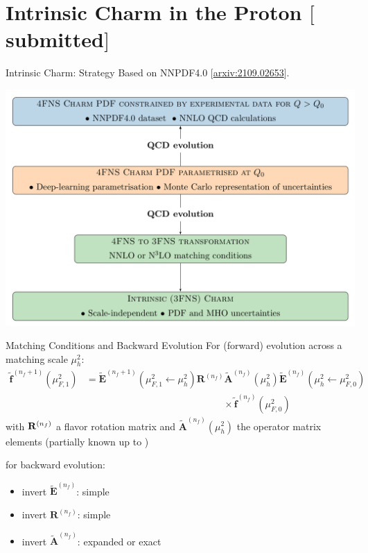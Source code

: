 \documentclass[9pt]{beamer}
\providecommand{\iRef}[1]{{\color{mLightGreen}\small $[$#1$]$}}
\begin{document}
\section{Intrinsic Charm in the Proton \iRef{submitted}}

\begin{frame}{Intrinsic Charm: Strategy}
    Based on NNPDF4.0 \iRef{\href{https://arxiv.org/abs/2109.02653}{arxiv:2109.02653}}.

	\begin{center}
        \includegraphics[scale=.6]{strategy.png}
	\end{center}
\end{frame}

\begin{frame}{Matching Conditions and Backward Evolution}
	For (forward) evolution across a matching scale $\mu_h^2$:
	\begin{align*} \tilde{\mathbf{f}}^{(n_f+1)}(\mu_{F,1}^2) &= \tilde{\mathbf{E}}^{(n_f+1)}(\mu_{F,1}^2\leftarrow \mu_{h}^2)
		{\mathbf{R}^{(n_f)}}
		\tilde{\mathbf{A}}^{(n_f)}(\mu_{h}^2)
		\tilde{\mathbf{E}}^{(n_f)}(\mu_{h}^2\leftarrow \mu_{F,0}^2) \\
		& \hspace{170pt} \times \tilde{\mathbf{f}}^{(n_f)}(\mu_{F,0}^2)
	\end{align*}
	with $\vb R^{(n_f)}$ a flavor rotation matrix and $\tilde{\mathbf{A}}^{(n_f)}(\mu_{h}^2)$ the operator
	matrix elements (partially known up to \nnnlo{})

	for backward evolution:
	\begin{itemize}
		\item invert $\tilde{\mathbf E}^{(n_f)}$: simple
		\item invert $\mathbf{R}^{(n_f)}$: simple
		\item invert $\tilde{\mathbf{A}}^{(n_f)}$: expanded or exact
	\end{itemize}
\end{frame}
\end{document}
